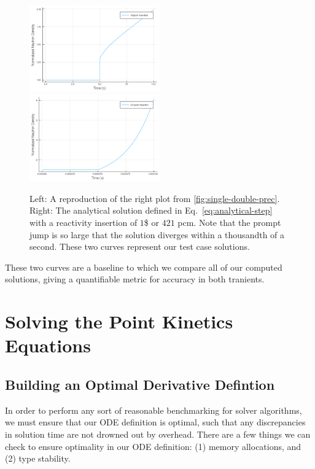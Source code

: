 \documentclass[review,onefignum,onetabnum]{siamart171218}
\begin{document}
\begin{figure}[htb]
  \includegraphics[width=0.5\textwidth]{../plots/analytical-sols/100pcm.png}
  \includegraphics[width=0.5\textwidth]{../plots/analytical-sols/421pcm.png}
  \caption{Left: A reproduction of the right plot from \cref{fig:single-double-prec}.
  Right: The analytical solution defined in Eq.~\cref{eq:analytical-step} with a
  reactivity insertion of $1$\$ or $421$ pcm. Note that the prompt jump is so large that the
  solution diverges within a thousandth of a second. These two curves represent our
  test case solutions.}
  \label{fig:dollar-insert-analytical}
\end{figure}

These two curves are a baseline to which we compare all of our computed solutions,
giving a quantifiable metric for accuracy in both tranients.

\section{Solving the Point Kinetics Equations}

\subsection{Building an Optimal Derivative Defintion}
In order to perform any sort of reasonable benchmarking for solver algorithms,
we must ensure that our ODE definition is optimal, such that any discrepancies in
solution time are not drowned out by overhead. There are a few things we can check
to ensure optimality in our ODE definition: (1) memory allocations, and (2) type stability. \\
\end{document}
